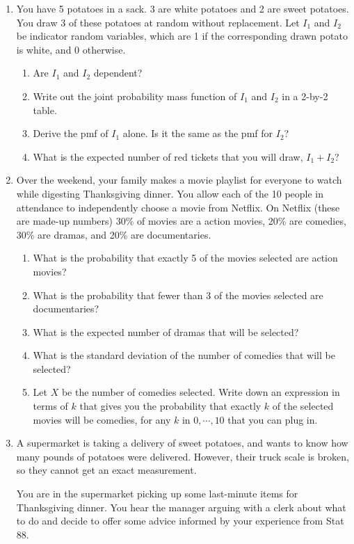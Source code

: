 \documentclass[11pt]{article}
\begin{document}
\begin{enumerate}
\item You have 5 potatoes in a sack. 3 are white potatoes and 2 are sweet potatoes. You draw 3 of these potatoes at random without replacement. Let $I_1$ and $I_2$ be indicator random variables, which are 1 if the corresponding drawn potato is white, and 0 otherwise.
\begin{enumerate}
\item Are $I_1$ and $I_2$ dependent?
\item Write out the joint probability mass function of $I_1$ and $I_2$ in a 2-by-2 table.
\item Derive the pmf of $I_1$ alone. Is it the same as the pmf for $I_2$?
\item What is the expected number of red tickets that you will draw, $I_1 + I_2$?
\end{enumerate}

\item Over the weekend, your family makes a movie playlist for everyone to watch while digesting Thanksgiving dinner. You allow each of the 10 people in attendance to independently choose a movie from Netflix. On Netflix (these are made-up numbers) 30\% of movies are a action movies, 20\% are comedies, 30\% are dramas, and 20\% are documentaries.

\begin{enumerate}
\item What is the probability that exactly 5 of the movies selected are action movies?
\item What is the probability that fewer than 3 of the movies selected are documentaries?
\item What is the expected number of dramas that will be selected?
\item What is the standard deviation of the number of comedies that will be selected?
\item Let $X$ be the number of comedies selected. Write down an expression in terms of $k$ that gives you the probability that exactly $k$ of the selected movies will be comedies, for any $k$ in $0, \cdots, 10$ that you can plug in.
\end{enumerate}

\item A supermarket is taking a delivery of sweet potatoes, and wants to know how many pounds of potatoes were delivered. However, their truck scale is broken, so they cannot get an exact measurement.

You are in the supermarket picking up some last-minute items for Thanksgiving dinner. You hear the manager arguing with a clerk about what to do and decide to offer some advice informed by your experience from Stat 88.


\end{enumerate}
\end{document}
